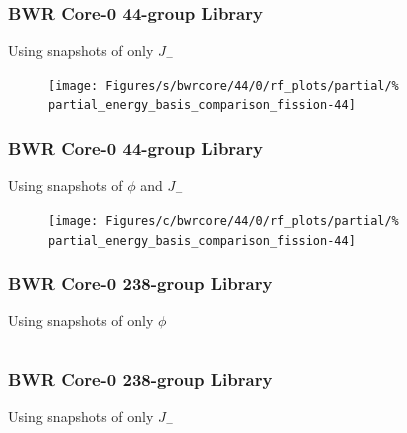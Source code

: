 \documentclass[fleqn]{beamer}
\begin{document}
  \begin{frame}
    \frametitle{BWR Core-0 44-group Library}
    \centering
    Using snapshots of only $J_-$
    \begin{figure}
    \texttt{[image: Figures/s/bwrcore/44/0/rf\_plots/partial/\%
        partial\_energy\_basis\_comparison\_fission-44]}
    \end{figure}
  \end{frame}
  
  \begin{frame}
    \frametitle{BWR Core-0 44-group Library}
    \centering
    Using snapshots of $\phi$ and $J_-$
    \begin{figure}
    \texttt{[image: Figures/c/bwrcore/44/0/rf\_plots/partial/\%
        partial\_energy\_basis\_comparison\_fission-44]}
    \end{figure}
  \end{frame}
  
    \begin{frame}
      \frametitle{BWR Core-0 238-group Library}
      \centering
      Using snapshots of only $\phi$
      \begin{figure}
        \begin{columns}[T]
            \begin{column}{0.5\textwidth}
          \end{column}
        \begin{column}{0.5\textwidth}
          \end{column}
      \end{columns}
  \end{figure}
  \end{frame}
  
    \begin{frame}
      \frametitle{BWR Core-0 238-group Library}
      \centering
      Using snapshots of only $J_-$
      \begin{figure}
        \begin{columns}[T]
            \begin{column}{0.5\textwidth}
          \end{column}
        \begin{column}{0.5\textwidth}
          \end{column}
      \end{columns}
  \end{figure}
  \end{frame}
 
\end{document}

